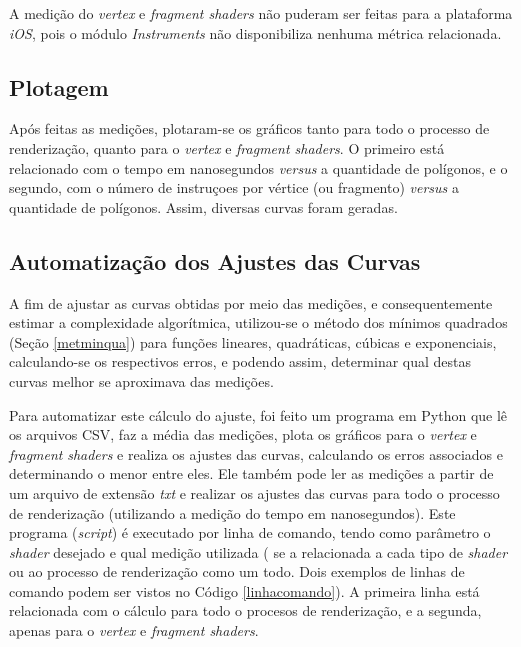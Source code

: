 	A medição do \textit{vertex} e \textit{fragment shaders} não puderam ser feitas para a plataforma \textit{iOS}, pois o módulo \textit{Instruments} não disponibiliza nenhuma métrica relacionada.

\subsection{Plotagem}

	Após feitas as medições, plotaram-se os gráficos tanto para todo o processo de renderização, quanto para o \textit{vertex} e \textit{fragment shaders}. O primeiro está relacionado com o tempo em nanosegundos \textit{versus} a quantidade de polígonos, e o segundo, com o número de instruçoes por vértice (ou fragmento) \textit{versus} a quantidade de polígonos. Assim, diversas curvas foram geradas.

\subsection{Automatização dos Ajustes das Curvas}

	A fim de ajustar as curvas obtidas por meio das medições, e consequentemente estimar a complexidade algorítmica, utilizou-se o método dos mínimos quadrados (Seção \ref{metminqua}) para funções lineares, quadráticas, cúbicas e exponenciais, calculando-se os respectivos erros, e podendo assim, determinar qual destas curvas melhor se aproximava das medições. 

	 Para automatizar este cálculo do ajuste, foi feito um programa em Python que lê os arquivos CSV, faz a média das medições, plota os gráficos para o \textit{vertex} e \textit{fragment} \textit{shaders} e realiza os ajustes das curvas, calculando os erros associados e determinando o menor entre eles.  Ele também pode ler as medições a partir de um arquivo de extensão \textit{txt} e realizar os ajustes das curvas para todo o processo de renderização (utilizando a medição do tempo em nanosegundos). Este programa (\textit{script}) é executado por linha de comando, tendo como parâmetro o \textit{shader} desejado e qual medição utilizada ( se a relacionada a cada tipo de \textit{shader} ou ao processo de renderização como um todo. Dois exemplos de linhas de comando podem ser vistos no Código \ref{linhacomando}). A primeira linha está relacionada com o cálculo para todo o procesos de renderização, e a segunda, apenas para o \textit{vertex} e \textit{fragment shaders}.

	


